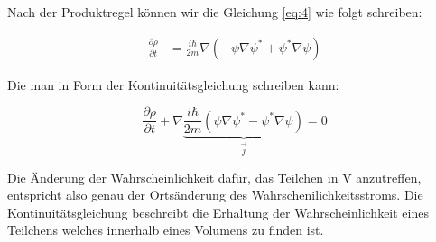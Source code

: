 Nach der Produktregel können wir die Gleichung \eqref{eq:4} wie folgt schreiben:

\begin{align}
  \label{eq:5}
\frac{\partial \rho}{\partial t}  &= \frac{i\hbar}{2m} \nabla(-\psi \nabla\psi^* + \psi^* \nabla\psi)
\end{align}

Die man in Form der Kontinuitätsgleichung schreiben kann:

\[ \boxed{\frac{\partial \rho}{\partial t} + \nabla \underbrace{ \frac{i\hbar}{2m}(\psi \nabla\psi^* - \psi^* \nabla\psi )}_{\vec j} = 0} \]

Die Änderung der Wahrscheinlichkeit dafür, das Teilchen in V anzutreffen, entspricht also genau der Ortsänderung des  Wahrschenilichkeitsstroms.
Die Kontinuitätsgleichung beschreibt die Erhaltung der Wahrscheinlichkeit eines Teilchens welches innerhalb eines Volumens zu finden ist.






